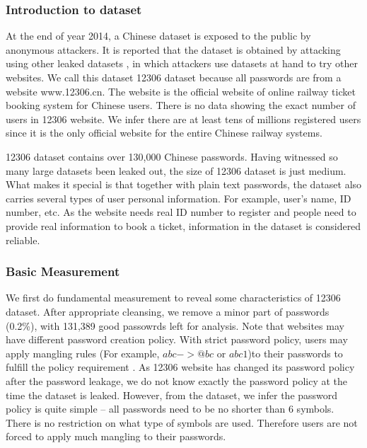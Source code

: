 \documentclass{sig-alternate}
\begin{document}
\subsubsection{Introduction to dataset}
At the end of year 2014, a Chinese dataset is exposed to the public by anonymous attackers. It is reported that the dataset is obtained by attacking using other leaked datasets \cite{tencentnews}, in which attackers use datasets at hand to try other websites. We call this dataset 12306 dataset because all passwords are from a website www.12306.cn. The website is the official website of online railway ticket booking system for Chinese users. There is no data showing the exact number of users in 12306 website. We infer there are at least tens of millions registered users since it is the only official website for the entire Chinese railway systems.

12306 dataset contains over 130,000 Chinese passwords. Having witnessed so many large datasets been leaked out, the size of 12306 dataset is just medium. What makes it special is that together with plain text passwords, the dataset also carries several types of user personal information. For example, user's name, ID number, etc. As the website needs real ID number to register and people need to provide real information to book a ticket, information in the dataset is considered reliable.

\subsubsection{Basic Measurement}
We first do fundamental measurement to reveal some characteristics of 12306 dataset. After appropriate cleansing, we remove a minor part of passwords (0.2\%), with 131,389 good passowrds left for analysis. Note that websites may have different password creation policy. With strict password policy, users may apply mangling rules (For example, $abc -> @bc$ or $abc1$)to their passwords to fulfill the policy requirement \cite{weir2010testing}. As 12306 website has changed its password policy after the password leakage, we do not know exactly the password policy at the time the dataset is leaked. However, from the dataset, we infer the password policy is quite simple -- all passwords need to be no shorter than 6 symbols. There is no restriction on what type of symbols are used. Therefore users are not forced to apply much mangling to their passwords. 
\end{document}
